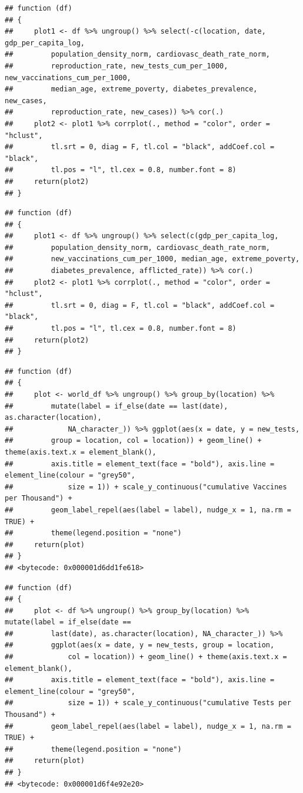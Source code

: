 \documentclass[11pt,preprint, authoryear]{elsarticle}
\numberwithin{equation}{section}
\numberwithin{figure}{section}
\numberwithin{table}{section}
\begin{document}
\begin{verbatim}
## function (df) 
## {
##     plot1 <- df %>% ungroup() %>% select(-c(location, date, gdp_per_capita_log, 
##         population_density_norm, cardiovasc_death_rate_norm, 
##         reproduction_rate, new_tests_cum_per_1000, new_vaccinations_cum_per_1000, 
##         median_age, extreme_poverty, diabetes_prevalence, new_cases, 
##         reproduction_rate, new_cases)) %>% cor(.)
##     plot2 <- plot1 %>% corrplot(., method = "color", order = "hclust", 
##         tl.srt = 0, diag = F, tl.col = "black", addCoef.col = "black", 
##         tl.pos = "l", tl.cex = 0.8, number.font = 8)
##     return(plot2)
## }
\end{verbatim}

\begin{verbatim}
## function (df) 
## {
##     plot1 <- df %>% ungroup() %>% select(c(gdp_per_capita_log, 
##         population_density_norm, cardiovasc_death_rate_norm, 
##         new_vaccinations_cum_per_1000, median_age, extreme_poverty, 
##         diabetes_prevalence, afflicted_rate)) %>% cor(.)
##     plot2 <- plot1 %>% corrplot(., method = "color", order = "hclust", 
##         tl.srt = 0, diag = F, tl.col = "black", addCoef.col = "black", 
##         tl.pos = "l", tl.cex = 0.8, number.font = 8)
##     return(plot2)
## }
\end{verbatim}

\begin{verbatim}
## function (df) 
## {
##     plot <- world_df %>% ungroup() %>% group_by(location) %>% 
##         mutate(label = if_else(date == last(date), as.character(location), 
##             NA_character_)) %>% ggplot(aes(x = date, y = new_tests, 
##         group = location, col = location)) + geom_line() + theme(axis.text.x = element_blank(), 
##         axis.title = element_text(face = "bold"), axis.line = element_line(colour = "grey50", 
##             size = 1)) + scale_y_continuous("cumulative Vaccines per Thousand") + 
##         geom_label_repel(aes(label = label), nudge_x = 1, na.rm = TRUE) + 
##         theme(legend.position = "none")
##     return(plot)
## }
## <bytecode: 0x000001d6dd1fe618>
\end{verbatim}

\begin{verbatim}
## function (df) 
## {
##     plot <- df %>% ungroup() %>% group_by(location) %>% mutate(label = if_else(date == 
##         last(date), as.character(location), NA_character_)) %>% 
##         ggplot(aes(x = date, y = new_tests, group = location, 
##             col = location)) + geom_line() + theme(axis.text.x = element_blank(), 
##         axis.title = element_text(face = "bold"), axis.line = element_line(colour = "grey50", 
##             size = 1)) + scale_y_continuous("cumulative Tests per Thousand") + 
##         geom_label_repel(aes(label = label), nudge_x = 1, na.rm = TRUE) + 
##         theme(legend.position = "none")
##     return(plot)
## }
## <bytecode: 0x000001d6f4e92e20>
\end{verbatim}
\end{document}
